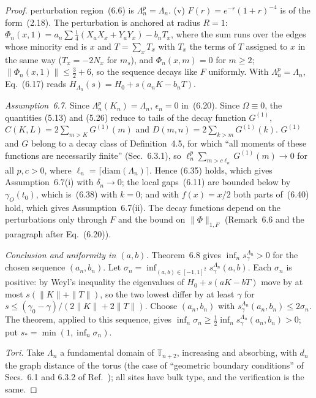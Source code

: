\documentclass[aps,prx,onecolumn,10pt,nofootinbib,longbibliography,floatfix]{revtex4-2}
\theoremstyle{remark}
\newcommand{\ms}{m_s}
\begin{document}
\begin{proof}
perturbation region~(6.6) is $\Lambda^p_n=\Lambda_n$. %
(v) $F(r)=e^{-r}(1+r)^{-4}$ is of the form~(2.18). The perturbation is anchored at radius $R=1$: %
$\Phi_n(x,1)=a_n\sum\frac14(X_aX_x+Y_aY_x)-b_nT_x$, where the sum runs over the edges whose minority end is $x$ and
$T=\sum_xT_x$ with $T_x$ the terms of $T$ assigned to $x$ in the same way ($T_x=-2N_x$ for $\ms$), and
$\Phi_n(x,m)=0$ for $m\ge2$; $\|\Phi_n(x,1)\|\le\frac32+6$, so the sequence decays like $F$ uniformly. With
$\Lambda^p_n=\Lambda_n$, Eq.~(6.17) reads $H_{\Lambda_n}(s)=H_0+s(a_nK-b_nT)$. %

\emph{Assumption~6.7.} Since $\Lambda^p_n(K_n)=\Lambda_n$, $\epsilon_n=0$ in~(6.20). Since $\Omega\equiv0$, the quantities %
(5.13) and (5.26) reduce to tails of the decay function $G^{(1)}$, %
$C(K,L)=2\sum_{m>K}G^{(1)}(m)$ and $D(m,n)=2\sum_{k>m}G^{(1)}(k)$. $G^{(1)}$ and $G$ belong to a decay class of
Definition~4.5, for which ``all moments of these functions are necessarily finite'' (Sec.~6.3.1), so %
$\ell_n^p\sum_{m>c\ell_n}G^{(1)}(m)\to0$ for all $p,c>0$, where $\ell_n=\lceil\mathrm{diam}(\Lambda_n)\rceil$. Hence
(6.35) holds, which gives Assumption~6.7(i) with $\delta_n\to0$; the local gaps~(6.11) are bounded below by %
$\gamma_O(t_0)$, which is~(6.38) with $k=0$; and with $f(x)=x/2$ both parts of~(6.40) hold, which gives %
Assumption~6.7(ii). The decay functions depend on the perturbations only through $F$ and the bound on %
$\|\Phi\|_{1,F}$ (Remark~6.6 and the paragraph after Eq.~(6.20)). %

\emph{Conclusion and uniformity in $(a,b)$.} Theorem~6.8 gives $\inf_ns^{\Lambda_n}_\gamma>0$ for the chosen sequence %
$(a_n,b_n)$. Let $\sigma_n=\inf_{(a,b)\in[-1,1]^2}s^{\Lambda_n}_\gamma(a,b)$. Each $\sigma_n$ is positive: by Weyl's inequality
the eigenvalues of $H_0+s(aK-bT)$ move by at most $s(\|K\|+\|T\|)$, so the two lowest differ by at least $\gamma$ for
$s\le(\gamma_0-\gamma)/(2\|K\|+2\|T\|)$. Choose $(a_n,b_n)$ with $s^{\Lambda_n}_\gamma(a_n,b_n)\le2\sigma_n$. The theorem,
applied to this sequence, gives $\inf_n\sigma_n\ge\frac12\inf_ns^{\Lambda_n}_\gamma(a_n,b_n)>0$; put
$s_*=\min(1,\inf_n\sigma_n)$.

\emph{Tori.} Take $\Lambda_n$ a fundamental domain of $\mathbb T_{n+2}$, increasing and absorbing, with $d_n$ the graph
distance of the torus (the case of ``geometric boundary conditions'' of Secs.~6.1 and 6.3.2 of Ref.~\cite{nsy2022}); %
all sites have bulk type, and the verification is the same.
\end{proof}
\end{document}
